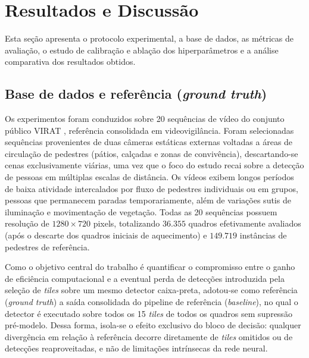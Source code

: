 \documentclass{ieeeaccess}
\begin{document}
\section{Resultados e Discussão}
\label{sec:resultados}

Esta seção apresenta o protocolo experimental, a base de dados, as métricas de avaliação, o estudo de calibração e ablação dos hiperparâmetros e a análise comparativa dos resultados obtidos.

\subsection{Base de dados e referência (\textit{ground truth})}
\label{subsec:dataset}

Os experimentos foram conduzidos sobre 20 sequências de vídeo do conjunto público VIRAT \cite{oh2011virat}, referência consolidada em videovigilância. Foram selecionadas sequências provenientes de duas câmeras estáticas externas voltadas a áreas de circulação de pedestres (pátios, calçadas e zonas de convivência), descartando-se cenas exclusivamente viárias, uma vez que o foco do estudo recai sobre a detecção de pessoas em múltiplas escalas de distância. Os vídeos exibem longos períodos de baixa atividade intercalados por fluxo de pedestres individuais ou em grupos, pessoas que permanecem paradas temporariamente, além de variações sutis de iluminação e movimentação de vegetação. Todas as 20 sequências possuem resolução de $1280 \times 720$ pixels, totalizando $36.355$ quadros efetivamente avaliados (após o descarte dos quadros iniciais de aquecimento) e $149.719$ instâncias de pedestres de referência.

Como o objetivo central do trabalho é quantificar o compromisso entre o ganho de eficiência computacional e a eventual perda de detecções introduzida pela seleção de \textit{tiles} sobre um mesmo detector caixa-preta, adotou-se como referência (\textit{ground truth}) a saída consolidada do pipeline de referência (\textit{baseline}), no qual o detector é executado sobre todos os 15 \textit{tiles} de todos os quadros sem supressão pré-modelo. Dessa forma, isola-se o efeito exclusivo do bloco de decisão: qualquer divergência em relação à referência decorre diretamente de \textit{tiles} omitidos ou de detecções reaproveitadas, e não de limitações intrínsecas da rede neural.
\end{document}
